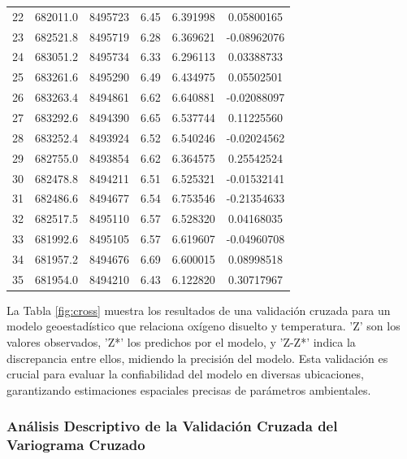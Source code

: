 \begin{longtable}{cccccc}
22 &682011.0 &8495723 &6.45& 6.391998 & 0.05800165\\
23 &682521.8 &8495719 &6.28& 6.369621 &-0.08962076\\
24& 683051.2& 8495734 &6.33& 6.296113&  0.03388733\\
25& 683261.6& 8495290 &6.49& 6.434975 & 0.05502501\\
26 &683263.4 &8494861& 6.62& 6.640881 &-0.02088097\\
27 &683292.6& 8494390 &6.65 &6.537744&  0.11225560\\
28& 683252.4& 8493924 &6.52& 6.540246 &-0.02024562\\
29& 682755.0 &8493854 &6.62& 6.364575 & 0.25542524\\
30 &682478.8 &8494211 &6.51& 6.525321 &-0.01532141\\
31 &682486.6 &8494677 &6.54& 6.753546 &-0.21354633\\
32& 682517.5 &8495110 &6.57& 6.528320&  0.04168035\\
33 &681992.6 &8495105 &6.57 &6.619607 &-0.04960708\\
34& 681957.2& 8494676 &6.69 &6.600015&  0.08998518\\
35& 681954.0  &8494210 &6.43 &6.122820&  0.30717967\\
\end{longtable}

La Tabla \ref{fig:cross} muestra los resultados de una validación cruzada para un modelo geoestadístico que relaciona oxígeno disuelto y temperatura. 'Z' son los valores observados, 'Z*' los predichos por el modelo, y 'Z-Z*' indica la discrepancia entre ellos, midiendo la precisión del modelo. Esta validación es crucial para evaluar la confiabilidad del modelo en diversas ubicaciones, garantizando estimaciones espaciales precisas de parámetros ambientales.

\subsubsection{Análisis Descriptivo de la Validación Cruzada del Variograma Cruzado}

